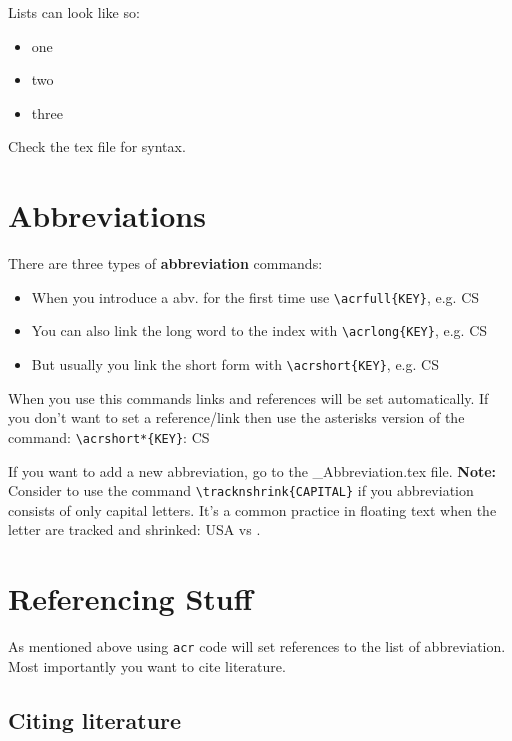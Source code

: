 Lists can look like so:

\begin{itemize}
	\setlength\itemsep{-0.75em} %
	\item one
	\item two
	\item three
\end{itemize}

Check the tex file for syntax.

\section{Abbreviations}

There are three types of \textbf{abbreviation} commands:

\begin{itemize}
	\setlength\itemsep{-0.75em} %
	\item When you introduce a abv. for the first time use \verb|\acrfull{KEY}|, e.g. \acrfull{CS}
	\item You can also link the long word to the index with \verb|\acrlong{KEY}|, e.g. \acrlong{CS}
	\item But usually you link the short form with \verb|\acrshort{KEY}|, e.g. \acrshort{CS}
\end{itemize}

When you use this commands links and references will be set automatically. If you don’t want to set a reference/link then use the asterisks version of the command: \verb|\acrshort*{KEY}|: \acrshort*{CS}

If you want to add a new abbreviation, go to the \_Abbreviation.tex file. \textbf{Note:} Consider to use the command \verb|\tracknshrink{CAPITAL}| if you abbreviation consists of only capital letters. It’s a common practice in floating text when the letter are tracked and shrinked: USA vs . 

\section{Referencing Stuff}

As mentioned above using \verb|acr| code will set references to the list of abbreviation. Most importantly you want to cite literature. 

\subsection{Citing literature}

